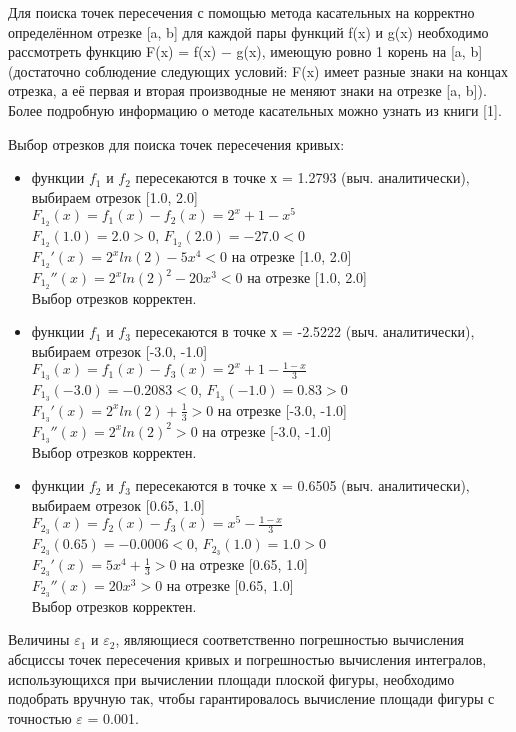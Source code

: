 \documentclass[a4paper,12pt,titlepage,finall]{article}
\begin{document}
Для поиска точек пересечения с помощью метода касательных на корректно определённом отрезке [a, b] для каждой пары функций f(x) и g(x) необходимо рассмотреть функцию F(x) = f(x) − g(x), имеющую ровно 1 корень на [a, b] (достаточно соблюдение следующих условий: F(x) имеет разные знаки на концах отрезка, а её первая и вторая производные не меняют знаки на отрезке [a, b]). Более подробную информацию о методе касательных можно узнать из книги [1].

{Выбор отрезков для поиска точек пересечения кривых:}
\begin{itemize}
\item функции $f_1$ и $f_2$ пересекаются в точке х = 1.2793 (выч. аналитически), выбираем отрезок [1.0, 2.0]\\
$F_1_2(x) = f_1(x) - f_2(x) = 2^x + 1 - x^5$ \\
$F_1_2(1.0) = 2.0 > 0$, $F_1_2(2.0) = -27.0 < 0$ \\
$F_1_2'(x) = 2^xln(2) - 5x^4 < 0$ на отрезке [1.0, 2.0]\\
$F_1_2''(x) = 2^xln(2)^2 - 20x^3 < 0$ на отрезке [1.0, 2.0]\\
Выбор отрезков корректен.
\item функции $f_1$ и $f_3$ пересекаются в точке х = -2.5222 (выч. аналитически), выбираем отрезок [-3.0, -1.0]\\
$F_1_3(x) = f_1(x) - f_3(x) = 2^x + 1 - \frac{1-x}{3}$ \\
$F_1_3(-3.0) = -0.2083 < 0$, $F_1_3(-1.0) = 0.83 > 0$ \\
$F_1_3'(x) = 2^xln(2) + \frac{1}{3} > 0$ на отрезке [-3.0, -1.0]\\
$F_1_3''(x) = 2^xln(2)^2 > 0$ на отрезке [-3.0, -1.0]\\
Выбор отрезков корректен.
\item функции $f_2$ и $f_3$ пересекаются в точке х = 0.6505 (выч. аналитически), выбираем отрезок [0.65, 1.0]\\
$F_2_3(x) = f_2(x) - f_3(x) = x^5 - \frac{1-x}{3}$ \\
$F_2_3(0.65) = -0.0006 < 0$, $F_2_3(1.0) = 1.0 > 0$ \\
$F_2_3'(x) = 5x^4 + \frac{1}{3} > 0$ на отрезке [0.65, 1.0]\\
$F_2_3''(x) = 20x^3 > 0$ на отрезке [0.65, 1.0]\\
Выбор отрезков корректен.
\end{itemize}

\newline
Величины $\varepsilon_1$ и $\varepsilon_2$, являющиеся соответственно погрешностью вычисления абсциссы точек пересечения кривых и погрешностью вычисления интегралов, использующихся при вычислении площади плоской фигуры, необходимо подобрать вручную так, чтобы гарантировалось вычисление площади фигуры с точностью $\varepsilon$ = 0.001.
\end{document}

